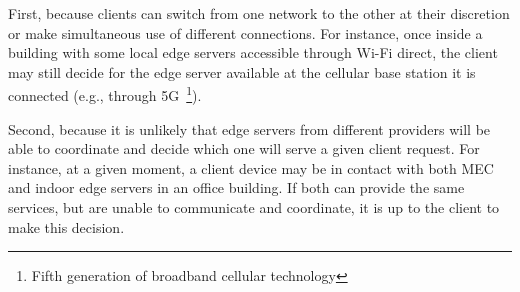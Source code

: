 %
%
%

First, because clients can switch from one network to the other at their discretion or make simultaneous use of different connections. For instance, once inside a building with some local edge servers accessible through Wi-Fi direct, the client may still decide for the edge server available at the cellular base station it is connected (e.g., through 5G~\footnote{Fifth generation of broadband cellular technology}). 

Second, because it is unlikely that edge servers from different providers will be able to coordinate and decide which one will serve a given client request. For instance, at a given moment, a client device may be in contact with both MEC and indoor edge servers in an office building. If both can provide the same services, but are unable to communicate and coordinate, it is up to the client to make this decision.






